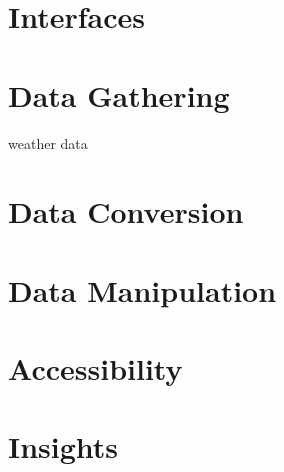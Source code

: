 \documentclass[11pt]{IEEEtran}
\begin{document}
\section{Interfaces} \label{sec:Interfaces}


\section{Data Gathering} \label{sec:DataGathering}
weather data

\section{Data Conversion} \label{sec:DataConversion}

\section{Data Manipulation} \label{sec:DataManipulation}

\section{Accessibility} \label{sec:Accessibility}

\section{Insights} \label{sec:Insights}


\cite{datasite}



\end{document}
